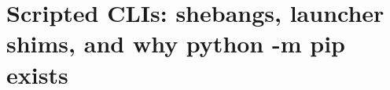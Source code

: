 \chapter{Scripted CLIs: shebangs, launcher shims, and why python -m pip exists}
\label{ch:scripted-clis-shebangs-launcher-shims}


